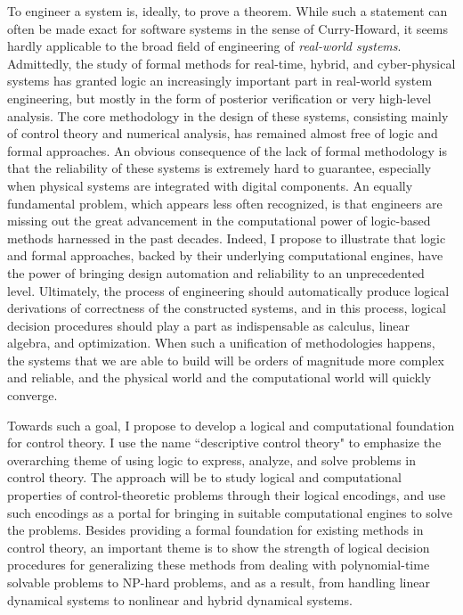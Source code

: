 \documentclass[10pt]{article}
\theoremstyle{definition}
\begin{document}
To engineer a system is, ideally, to prove a theorem. While such a statement can often be made exact for software systems in the sense of Curry-Howard, it seems hardly applicable to the broad field of engineering of {\em real-world systems}. Admittedly, the study of formal methods for real-time, hybrid, and cyber-physical systems has granted logic an increasingly important part in real-world system engineering, but mostly in the form of posterior verification or very high-level analysis. The core methodology in the design of these systems, consisting mainly of control theory and numerical analysis, has remained almost free of logic and formal approaches. An obvious consequence of the lack of formal methodology is that the reliability of these systems is extremely hard to guarantee, especially when physical systems are integrated with digital components. An equally fundamental problem, which appears less often recognized, is that engineers are missing out the great advancement in the computational power of logic-based methods harnessed in the past decades. Indeed, I propose to illustrate that logic and formal approaches, backed by their underlying computational engines, have the power of bringing design automation and reliability to an unprecedented level. Ultimately, the process of engineering should automatically produce logical derivations of correctness of the constructed systems, and in this process, logical decision procedures should play a part as indispensable as calculus, linear algebra, and optimization. When such a unification of methodologies happens, the systems that we are able to build will be orders of magnitude more complex and reliable, and the physical world and the computational world will quickly converge. 

Towards such a goal, I propose to develop a logical and computational foundation for control theory. I use the name ``descriptive control theory" to emphasize the overarching theme of using logic to express, analyze, and solve problems in control theory. The approach will be to study logical and computational properties of control-theoretic problems through their logical encodings, and use such encodings as a portal for bringing in suitable computational engines to solve the problems. Besides providing a formal foundation for existing methods in control theory, an important theme is to show the strength of logical decision procedures for generalizing these methods from dealing with polynomial-time solvable problems to NP-hard problems, and as a result, from handling linear dynamical systems to nonlinear and hybrid dynamical systems. 
 
\end{document}
